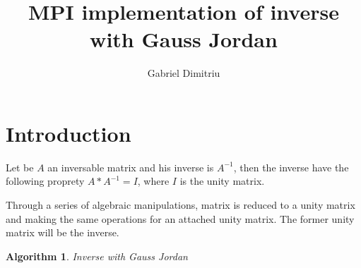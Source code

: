 \documentclass[a4paper]{article}
\newtheorem{algorithm}[theorem]{Algorithm}
\begin{document}
\title{MPI implementation of inverse with Gauss Jordan}
\date{}
\author{Gabriel Dimitriu}
\maketitle

\section{\protect\bigskip Introduction}

\bigskip Let be $A$ an inversable matrix and his inverse is $A^{-1}$, then
the inverse have the following proprety $A\ast A^{-1}=I$, where $I$ is the
unity matrix.

Through a series of algebraic manipulations, matrix is reduced to a unity
matrix and making the same operations for an attached unity matrix. The
former unity matrix will be the inverse.

\begin{algorithm}
Inverse with Gauss Jordan
\end{algorithm}
\end{document}
